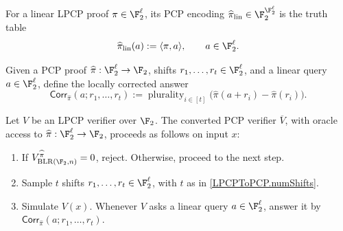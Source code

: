 \begin{definition}
\label{LPCPToPCP.encodedProof}
{}
\leanok
For a linear LPCP proof \(\pi\in\F_2^\ell\), its PCP encoding \(\widehat{\pi}_{\mathrm{lin}} \in \F_2^{\F_2^\ell}\) is the truth
table
\[
  \widehat{\pi}_{\mathrm{lin}}(a) := \langle \pi,a\rangle,
  \qquad a\in\F_2^\ell.
\]
\end{definition}

\begin{definition}
\label{LPCPToPCP.correctedAnswer}
{}
\leanok
Given a PCP proof \(\widehat{\pi}:\F_2^\ell\to\F_2\), shifts
\(r_1,\dots,r_t\in\F_2^\ell\), and a linear query \(a\in\F_2^\ell\), define
the locally corrected answer
\[
  \mathsf{Corr}_{\widehat{\pi}}(a;r_1,\dots,r_t)
  :=
  \operatorname{plurality}_{i\in[t]}
  \bigl(\widehat{\pi}(a+r_i)-\widehat{\pi}(r_i)\bigr).
\]
\end{definition}

\begin{definition}
\label{LPCPToPCP.verifier}
\leanok
Let \(V\) be an LPCP verifier over \(\F_2\). The converted PCP verifier
\(\overline V\), with oracle access to
\(\widehat{\pi}:\F_2^\ell\to\F_2\), proceeds as follows on input \(x\):
\begin{enumerate}
  \item If \(V_{\mathrm{BLR}(\F_{2}, n)}^{\widehat{\pi}}=0\), reject. Otherwise, proceed to the next step.
  \item Sample \(t\) shifts \(r_1,\dots,r_t\in\F_2^\ell\), with \(t\) as in
    \ref{LPCPToPCP.numShifts}.
  \item Simulate \(V(x)\). Whenever \(V\) asks a linear query
    \(a\in\F_2^\ell\), answer it by
    \(\mathsf{Corr}_{\widehat{\pi}}(a;r_1,\dots,r_t)\).
\end{enumerate}
\end{definition}


